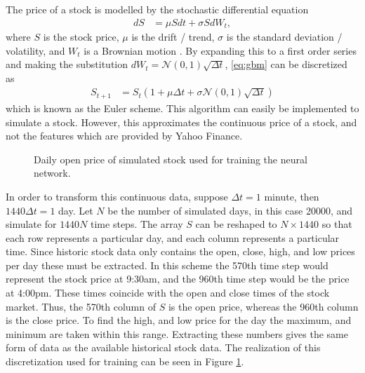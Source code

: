 \documentclass[12pt]{article}
\begin{document}
The price of a stock is modelled by the stochastic differential equation
\begin{align}
dS &= \mu S dt + \sigma S dW_t,
\label{eq:gbm}
\end{align}
where $S$ is the stock price, $\mu$ is the drift / trend, $\sigma$ is the standard deviation / volatility, and $W_t$ is a Brownian motion \cite{dineen, williams}. By expanding this to a first order series and making the substitution $dW_t = \mathcal{N}(0,1) \sqrt{\Delta t}$, \eqref{eq:gbm} can be discretized as
\begin{align*}
S_{t+1} &= S_t \left( 1 + \mu \Delta t + \sigma \mathcal{N}(0,1) \sqrt{\Delta t} \right)
\end{align*}
which is known as the Euler scheme. This algorithm can easily be implemented to simulate a stock. However, this approximates the continuous price of a stock, and not the features which are provided by Yahoo Finance. \\

\begin{figure}[htbp]
\centering
{}
\caption{Daily open price of simulated stock used for training the neural network.}
\label{fig:toystock}
\end{figure}

In order to transform this continuous data, suppose $\Delta t = 1$ minute, then $1440 \Delta t = 1$ day. Let $N$ be the number of simulated days, in this case 20000, and simulate for $1440N$ time steps. The array $S$ can be reshaped to $N $ so that each row represents a particular day, and each column represents a particular time. Since historic stock data only contains the open, close, high, and low prices per day these must be extracted. In this scheme the 570th time step would represent the stock price at 9:30am, and the 960th time step would be the price at 4:00pm. These times coincide with the open and close times of the stock market. Thus, the 570th column of $S$ is the open price, whereas the 960th column is the close price. To find the high, and low price for the day the maximum, and minimum are taken within this range. Extracting these numbers gives the same form of data as the available historical stock data. The realization of this discretization used for training can be seen in Figure \ref{fig:toystock}.
\end{document}

